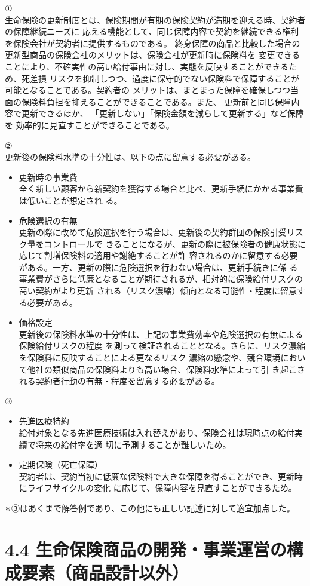 \documentclass[report,gutter=10mm,fore-edge=10mm,uplatex,dvipdfmx]{jlreq}
\begin{document}
①\\
生命保険の更新制度とは、保険期間が有期の保険契約が満期を迎える時、契約者の保障継続ニーズに
応える機能として、同じ保障内容で契約を継続できる権利を保険会社が契約者に提供するものである。
終身保障の商品と比較した場合の更新型商品の保険会社のメリットは、保険会社が更新時に保険料を
変更できることにより、不確実性の高い給付事由に対し、実態を反映することができるため、死差損
リスクを抑制しつつ、過度に保守的でない保険料で保障することが可能となることである。契約者の
メリットは、まとまった保障を確保しつつ当面の保険料負担を抑えることができることである。また、
更新前と同じ保障内容で更新できるほか、
「更新しない」「保険金額を減らして更新する」など保障を
効率的に見直すことができることである。

②\\
更新後の保険料水準の十分性は、以下の点に留意する必要がある。
\begin{itemize}
 \item 更新時の事業費\\
 全く新しい顧客から新契約を獲得する場合と比べ、更新手続にかかる事業費は低いことが想定され
 る。
 \item 危険選択の有無\\
 更新の際に改めて危険選択を行う場合は、更新後の契約群団の保険引受リスク量をコントロールで
 きることになるが、更新の際に被保険者の健康状態に応じて割増保険料の適用や謝絶することが許
 容されるのかに留意する必要がある。一方、更新の際に危険選択を行わない場合は、更新手続きに係
 る事業費がさらに低廉となることが期待されるが、相対的に保険給付リスクの高い契約がより更新
 される（リスク濃縮）傾向となる可能性・程度に留意する必要がある。
 \item 価格設定\\
 更新後の保険料水準の十分性は、上記の事業費効率や危険選択の有無による保険給付リスクの程度
 を測って検証されることとなる。さらに、リスク濃縮を保険料に反映することによる更なるリスク
 濃縮の懸念や、競合環境において他社の類似商品の保険料よりも高い場合、保険料水準によって引
 き起こされる契約者行動の有無・程度を留意する必要がある。
\end{itemize}
③
\begin{itemize}
 \item 先進医療特約\\
 給付対象となる先進医療技術は入れ替えがあり、保険会社は現時点の給付実績で将来の給付率を適
 切に予測することが難しいため。
 \item 定期保険（死亡保障）\\
 契約者は、契約当初に低廉な保険料で大きな保障を得ることができ、更新時にライフサイクルの変化
 に応じて、保障内容を見直すことができるため。
\end{itemize}
※③はあくまで解答例であり、この他にも正しい記述に対して適宜加点した。

\section{4.4 生命保険商品の開発・事業運営の構成要素（商品設計以外）}

\end{document}
